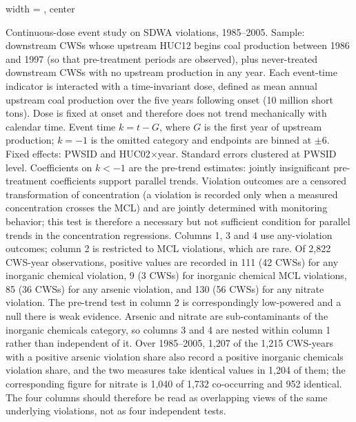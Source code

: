 \begin{table}[htbp]
\begin{adjustbox}{width = \textwidth, center}
      
   \end{adjustbox}
      {\tiny\linespread{1}\selectfont \par \raggedright 
   Continuous-dose event study on SDWA violations, 1985--2005. Sample: downstream CWSs whose upstream HUC12 begins coal production between 1986 and 1997 (so that pre-treatment periods are observed), plus never-treated downstream CWSs with no upstream production in any year. Each event-time indicator is interacted with a time-invariant dose, defined as mean annual upstream coal production over the five years following onset (10 million short tons). Dose is fixed at onset and therefore does not trend mechanically with calendar time. Event time $k = t - G$, where $G$ is the first year of upstream production; $k = -1$ is the omitted category and endpoints are binned at $\pm 6$. Fixed effects: PWSID and HUC02$\times$year. Standard errors clustered at PWSID level. Coefficients on $k < -1$ are the pre-trend estimates: jointly insignificant pre-treatment coefficients support parallel trends. Violation outcomes are a censored transformation of concentration (a violation is recorded only when a measured concentration crosses the MCL) and are jointly determined with monitoring behavior; this test is therefore a necessary but not sufficient condition for parallel trends in the concentration regressions. Columns 1, 3 and 4 use any-violation outcomes; column 2 is restricted to MCL violations, which are rare. Of 2,822 CWS-year observations, positive values are recorded in 111 (42 CWSs) for any inorganic chemical violation, 9 (3 CWSs) for inorganic chemical MCL violations, 85 (36 CWSs) for any arsenic violation, and 130 (56 CWSs) for any nitrate violation. The pre-trend test in column 2 is correspondingly low-powered and a null there is weak evidence. Arsenic and nitrate are sub-contaminants of the inorganic chemicals category, so columns 3 and 4 are nested within column 1 rather than independent of it. Over 1985--2005, 1,207 of the 1,215 CWS-years with a positive arsenic violation share also record a positive inorganic chemicals violation share, and the two measures take identical values in 1,204 of them; the corresponding figure for nitrate is 1,040 of 1,732 co-occurring and 952 identical. The four columns should therefore be read as overlapping views of the same underlying violations, not as four independent tests.}
   
\end{table}


